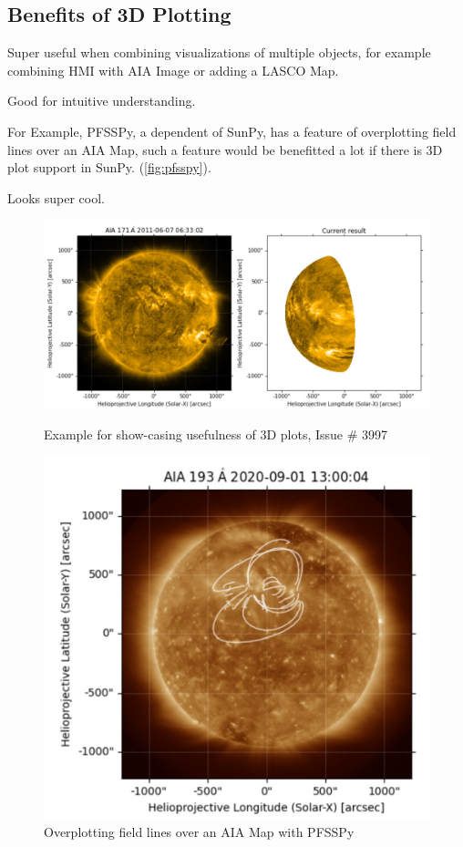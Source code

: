 \subsection{Benefits of 3D Plotting} \label{sec:benefits_of_3d_plot}
    \begin{focus}
        \item Super useful when combining visualizations of multiple objects, for example combining HMI with AIA Image or adding a LASCO Map.
        \item Good for intuitive understanding.
        \item For Example, PFSSPy, a dependent of SunPy, has a feature of overplotting field lines over an AIA Map, such a feature would be benefitted a lot if there is 3D plot support in SunPy. (\autoref{fig:pfsspy}).
        \item Looks super cool.
    \end{focus}
    \begin{figure}[H]
        \centering
        \includegraphics[scale=0.5]{figs/fig_3d_1.jpg}
        \caption{Example for show-casing usefulness of 3D plots, Issue \# 3997}
        \includegraphics[scale=0.5]{figs/fig_3d_pfss_2.jpg}
        \caption{Overplotting field lines over an AIA Map with PFSSPy}
        \label{fig:pfsspy}
    \end{figure}

